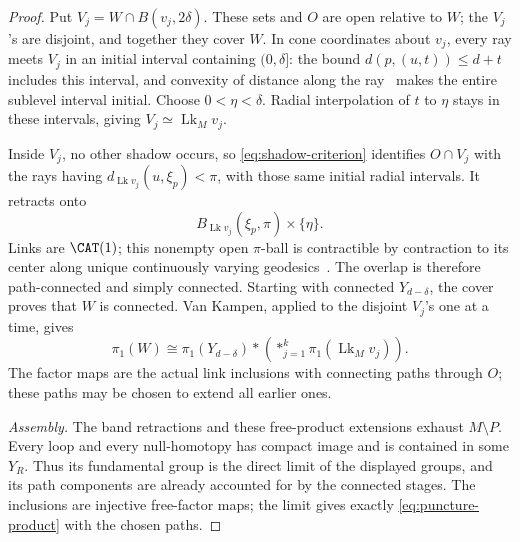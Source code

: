 \begin{proof}
Put \(V_j=W\cap B(v_j,2\delta)\). These sets and \(O\) are open
relative to \(W\); the \(V_j\)'s are disjoint, and together they
cover \(W\). In cone coordinates about \(v_j\), every ray meets
\(V_j\) in an initial interval containing \((0,\delta]\): the bound
\(d(p,(u,t))\le d+t\) includes this interval, and convexity of
distance along the ray~\cite[Proposition~II.2.2]{BH} makes the entire
sublevel interval initial. Choose \(0<\eta<\delta\). Radial
interpolation of \(t\) to \(\eta\) stays in these intervals, giving
\(V_j\simeq\operatorname{Lk}_M v_j\).

Inside \(V_j\), no other shadow occurs, so
\eqref{eq:shadow-criterion} identifies \(O\cap V_j\) with the rays
having \(d_{\operatorname{Lk}v_j}(u,\xi_p)<\pi\), with those same
initial radial intervals. It retracts onto
\[
 B_{\operatorname{Lk}v_j}(\xi_p,\pi)\times\{\eta\}.
\]
Links are \(\CAT(1)\); this nonempty open \(\pi\)-ball is
contractible by contraction to its center along unique continuously
varying geodesics~\cite[Proposition~II.1.4(1),(4)]{BH}.
The overlap is therefore path-connected and simply connected.
Starting with connected \(Y_{d-\delta}\), the cover proves that \(W\)
is connected. Van Kampen, applied to the disjoint \(V_j\)'s one at a
time, gives
\[
 \pi_1(W)\cong\pi_1(Y_{d-\delta})*
       \left(\mathop{*}_{j=1}^k\pi_1(\operatorname{Lk}_M v_j)\right).
\]
The factor maps are the actual link inclusions with connecting paths
through \(O\); these paths may be chosen to extend all earlier ones.

\smallskip\noindent
\emph{Assembly.}
The band retractions and these free-product extensions exhaust
\(M\setminus P\). Every loop and every null-homotopy has compact
image and is contained in some \(Y_R\). Thus its fundamental group
is the direct limit of the displayed groups, and its path components
are already accounted for by the connected stages. The inclusions
are injective free-factor maps; the limit gives exactly
\eqref{eq:puncture-product} with the chosen paths.
\end{proof}

